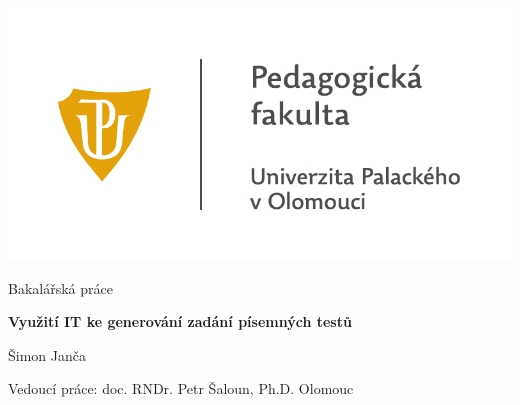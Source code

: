 \documentclass[11pt,a4paper]{report}
\begin{document}
	\begin{titlepage}
		\begin{center}
            {
                \centering
                \includegraphics[]{./files/img/UP_logo_PdF-UP_horizont_cz.pdf}

                \vspace{-5mm}
                \Large
            }

            \vspace{6cm}
			
			{
			    \Large
			    Bakalářská práce
                \vspace{4mm}
       
			    \textbf{\Huge Využití IT ke generování zadání písemných testů}
       
                \vspace{1cm}
                \LARGE
                Šimon Janča
            }

            \vfill
            
            {
                Vedoucí práce:
                doc. RNDr. Petr Šaloun, Ph.D.
                \hfill
    			Olomouc \the\year{}
            }
			
		\end{center}
	\end{titlepage}
    
    \thispagestyle{empty} %
    \null\vfill %
\end{document}
